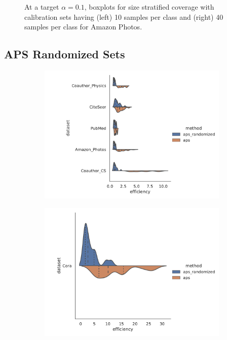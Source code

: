 \begin{figure}
\begin{subfigure}{0.48\linewidth}
    \end{subfigure}
    \caption{At a target $\alpha = 0.1$, boxplots for size stratified coverage with calibration sets having (left) 10 samples per class and (right) 40 samples per class for Amazon Photos.}
    \label{fig:nspc:citeseer:ssc}
\end{figure}

\subsection{APS Randomized Sets}
\begin{figure}
    \centering
    \begin{subfigure}{0.8\linewidth}
    \includegraphics[width=\linewidth,alt={Violin plots comparison randomized and non randomized efficieincy for APS across 5 datasets.}]{graphConformal/figures/split/aps_randomized_efficiency.png}
    \end{subfigure}
    \begin{subfigure}{0.6\linewidth}
        \includegraphics[width=\linewidth,alt={Violin plots comparison randomized and non randomized efficieincy for APS on Cora.}]{graphConformal/figures/split/aps_randomized_efficiency_cora.png}

\end{subfigure}
\end{figure}
